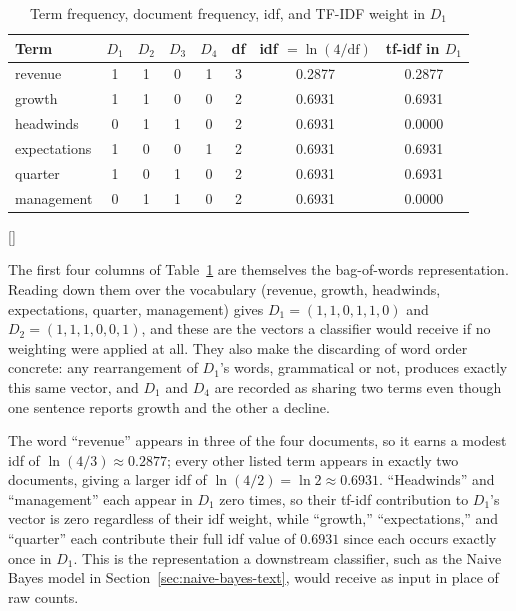 \documentclass[../ai_in_finance]{subfiles}
\begin{document}
\begin{table}[htbp]
\centering
\begin{lrbox}{\bookmeasuredbox}
\begin{tabular}{lccccccc}
\toprule
Term & $D_1$ & $D_2$ & $D_3$ & $D_4$ & df & idf $=\ln(4/\text{df})$ & tf-idf in $D_1$ \\
\midrule
revenue & 1 & 1 & 0 & 1 & 3 & 0.2877 & 0.2877 \\
growth & 1 & 1 & 0 & 0 & 2 & 0.6931 & 0.6931 \\
headwinds & 0 & 1 & 1 & 0 & 2 & 0.6931 & 0.0000 \\
expectations & 1 & 0 & 0 & 1 & 2 & 0.6931 & 0.6931 \\
quarter & 1 & 0 & 1 & 0 & 2 & 0.6931 & 0.6931 \\
management & 0 & 1 & 1 & 0 & 2 & 0.6931 & 0.0000 \\
\bottomrule
\end{tabular}
\end{lrbox}
\ifdim\wd\bookmeasuredbox<0.65\linewidth
\setlength{\bookcapwidth}{0.65\linewidth}
\else
\setlength{\bookcapwidth}{\wd\bookmeasuredbox}
\fi
{}[\bookcapwidth]{
\usebox{\bookmeasuredbox}
}{
\caption{Term frequency, document frequency, idf, and TF-IDF weight in $D_1$}
\label{tab:bow_tfidf}
}
\end{table}

The first four columns of Table~\ref{tab:bow_tfidf} are themselves the bag-of-words representation. Reading down them over the vocabulary (revenue, growth, headwinds, expectations, quarter, management) gives $D_1 = (1,1,0,1,1,0)$ and $D_2 = (1,1,1,0,0,1)$, and these are the vectors a classifier would receive if no weighting were applied at all. They also make the discarding of word order concrete: any rearrangement of $D_1$'s words, grammatical or not, produces exactly this same vector, and $D_1$ and $D_4$ are recorded as sharing two terms even though one sentence reports growth and the other a decline.

The word ``revenue'' appears in three of the four documents, so it earns a modest idf of $\ln(4/3) \approx 0.2877$; every other listed term appears in exactly two documents, giving a larger idf of $\ln(4/2) = \ln 2 \approx 0.6931$. ``Headwinds'' and ``management'' each appear in $D_1$ zero times, so their tf-idf contribution to $D_1$'s vector is zero regardless of their idf weight, while ``growth,'' ``expectations,'' and ``quarter'' each contribute their full idf value of $0.6931$ since each occurs exactly once in $D_1$. This is the representation a downstream classifier, such as the Naive Bayes model in Section~\ref{sec:naive-bayes-text}, would receive as input in place of raw counts.
\end{document}
